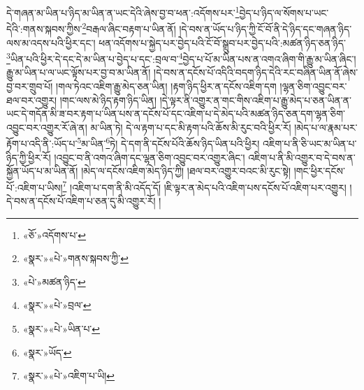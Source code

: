 དེ་གཞན་མ་ཡིན་པ་ཉིད་མ་ཡིན་ན་ཡང་དེའི་ཞེས་བྱ་བ་ཕན་:འདོགས་པར་\footnote{«ཅོ་»འདོགས་པ་}བྱེད་པ་ཉིད་ལ་སོགས་པ་ཡང་དེའི་:གནས་སྐབས་ཀྱིས་\footnote{«སྣར་»«པེ་»གནས་སྐབས་ཀྱི་}བརྒལ་ཞིང་བརྟག་པ་ཡིན་ནོ། །དེ་བས་ན་ཡོད་པ་ཉིད་ཀྱི་ངོ་བོ་ནི་དེ་ཉིད་དང་གཞན་ཉིད་ལས་མ་འདས་པའི་ཕྱིར་དང་། ཕན་འདོགས་པ་སྐྱེད་པར་བྱེད་པའི་ངོ་བོ་སྒྲུབ་པར་བྱེད་པའི་:མཚན་ཉིད་ཅན་ཉིད་\footnote{«པེ་»མཚན་ཉིད་}ཡིན་པའི་ཕྱིར་དེ་དང་དེ་མ་ཡིན་པ་བྱེད་པ་དང་:བྲལ་བ་\footnote{«སྣར་»«པེ་»བྲལ་}བྱེད་པ་པོ་མ་ཡིན་པས་ན་འགའ་ཞིག་གི་རྒྱུ་མ་ཡིན་ཞིང་། རྒྱུ་མ་ཡིན་པ་ལ་ཡང་ལྟོས་པར་བྱ་བ་མ་ཡིན་ནོ། །དེ་བས་ན་དངོས་པོ་འདིའི་བདག་ཉིད་དེའི་རང་བཞིན་ཡིན་ནོ་ཞེས་བྱ་བར་གྲུབ་པོ། །གལ་ཏེའང་འཇིག་རྒྱུ་མེད་ཅན་ཡིན། །རྟག་ཉིད་ཕྱིར་ན་དངོས་འཇིག་དག །ལྷན་ཅིག་འབྱུང་བར་ཐལ་བར་འགྱུར། །གང་ལས་མེ་ཉིད་རྟག་ཉིད་ཡིན། །དེ་ལྟར་ནི་འགྱུར་ན་གང་གིས་འཇིག་པ་རྒྱུ་མེད་པ་ཅན་ཡིན་ན་ཡང་དེ་གདོན་མི་ཟ་བར་རྟག་པ་ཡིན་པས་ན་དངོས་པོ་དང་འཇིག་པ་དེ་མེད་པའི་མཚན་ཉིད་ཅན་དག་ལྷན་ཅིག་འབྱུང་བར་འགྱུར་རོ་ཞེ་ན། མ་ཡིན་ཏེ། དེ་ལ་རྟག་པ་དང་མི་རྟག་པའི་ཆོས་མི་རུང་བའི་ཕྱིར་རོ། །མེད་པ་ལ་རྣམ་པར་རྟོག་པ་འདི་ནི་:ཡོད་པ་\footnote{«སྣར་»«པེ་»ཡིན་པ་}མ་ཡིན་\footnote{«སྣར་»ཡོད་}ཏེ། དེ་དག་ནི་དངོས་པོའི་ཆོས་ཉིད་ཡིན་པའི་ཕྱིར། འཇིག་པ་ནི་ཅི་ཡང་མ་ཡིན་པ་ཉིད་ཀྱི་ཕྱིར་རོ། །འབྱུང་བ་ནི་འགའ་ཞིག་དང་ལྷན་ཅིག་འབྱུང་བར་འགྱུར་ཞིང་། འཇིག་པ་ནི་མི་འགྱུར་བ་དེ་བས་ན་སྐྱོན་ཡོད་པ་མ་ཡིན་ནོ། །མེད་ལ་དངོས་འཇིག་མེད་ཉིད་ཀྱི། །ཐལ་བར་འགྱུར་བའང་མི་རུང་སྟེ། །གང་ཕྱིར་དངོས་པོ་:འཇིག་པ་ཡིས།\footnote{«སྣར་»«པེ་»འཇིག་པ་ཡི།} །འཇིག་པ་དག་ནི་མི་འདོད་དོ། །ཇི་ལྟར་ན་མེད་པའི་འཇིག་པས་དངོས་པོ་འཇིག་པར་འགྱུར། །དེ་བས་ན་དངོས་པོ་འཇིག་པ་ཅན་དུ་མི་འགྱུར་རོ། །
